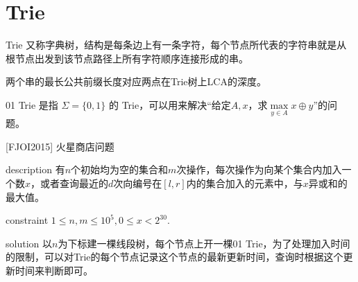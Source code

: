 \documentclass{beamer}
\theoremstyle{compact}
\def\le{\leqslant}
\begin{document}
\section{Trie}
\begin{frame}{Trie}
	又称字典树，结构是每条边上有一条字符，每个节点所代表的字符串就是从根节点出发到该节点路径上所有字符顺序连接形成的串。\\
	\pause
	
	两个串的最长公共前缀长度对应两点在Trie树上LCA的深度。\\
	\pause

	01 Trie 是指 $\Sigma = \{0, 1\}$ 的 Trie，可以用来解决“给定$A, x$，求$\max\limits_{y \in A} x \oplus y$”的问题。
\end{frame}
\begin{frame}{[FJOI2015] 火星商店问题}
	\begin{block}{description}
		有$n$个初始均为空的集合和$m$次操作，每次操作为向某个集合内加入一个数$x$，或者查询最近的$d$次向编号在$[l,r]$内的集合加入的元素中，与$x$异或和的最大值。
	\end{block}
	\begin{block}{constraint}
		$1 \le n, m \le 10^5, 0 \le x < 2^{30}.$
	\end{block}
	\pause
	\begin{block}{solution}
		以$n$为下标建一棵线段树，每个节点上开一棵01 Trie，为了处理加入时间的限制，可以对Trie的每个节点记录这个节点的最新更新时间，查询时根据这个更新时间来判断即可。
	\end{block}
\end{frame}
	
\end{document}
